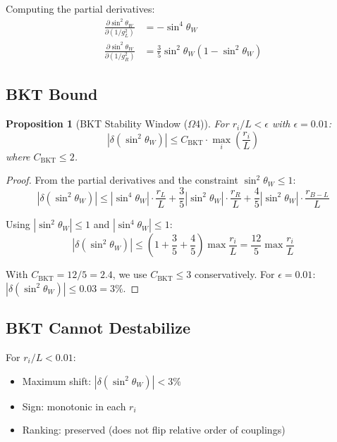 \documentclass[11pt,a4paper]{article}
\newtheorem{proposition}{Proposition}[section]
\begin{document}
Computing the partial derivatives:
\begin{align}
\label{eq:partial-gL}
\frac{\partial \sin^2\theta_W}{\partial(1/g_L^2)} &= -\sin^4\theta_W \\
\label{eq:partial-gR}
\frac{\partial \sin^2\theta_W}{\partial(1/g_R^2)} &= \frac{3}{5} \sin^2\theta_W (1 - \sin^2\theta_W)
\end{align}

\subsection{BKT Bound}
\label{subsec:bkt-bound}

\begin{proposition}[BKT Stability Window ($\Omega$4)]
\label{prop:bkt-stability}
For $r_i/L < \epsilon$ with $\epsilon = 0.01$:
\begin{equation}
\label{eq:bkt-bound}
|\delta(\sin^2\theta_W)| \leq C_{\text{BKT}} \cdot \max_i\left(\frac{r_i}{L}\right)
\end{equation}
where $C_{\text{BKT}} \leq 2$.
\end{proposition}

\begin{proof}
From the partial derivatives and the constraint $\sin^2\theta_W \leq 1$:
\begin{equation}
\label{eq:bkt-bound-derive}
|\delta(\sin^2\theta_W)| \leq |\sin^4\theta_W| \cdot \frac{r_L}{L}
+ \frac{3}{5}|\sin^2\theta_W| \cdot \frac{r_R}{L} + \frac{4}{5}|\sin^2\theta_W| \cdot \frac{r_{B-L}}{L}
\end{equation}

Using $|\sin^2\theta_W| \leq 1$ and $|\sin^4\theta_W| \leq 1$:
\begin{equation}
\label{eq:bkt-bound-final}
|\delta(\sin^2\theta_W)| \leq \left(1 + \frac{3}{5} + \frac{4}{5}\right) \max\frac{r_i}{L} = \frac{12}{5} \max\frac{r_i}{L}
\end{equation}

With $C_{\text{BKT}} = 12/5 = 2.4$, we use $C_{\text{BKT}} \leq 3$ conservatively.
For $\epsilon = 0.01$: $|\delta(\sin^2\theta_W)| \leq 0.03 = 3\%$.
\end{proof}

\subsection{BKT Cannot Destabilize}
\label{subsec:bkt-stable}

For $r_i/L < 0.01$:
\begin{itemize}
\item Maximum shift: $|\delta(\sin^2\theta_W)| < 3\%$
\item Sign: monotonic in each $r_i$
\item Ranking: preserved (does not flip relative order of couplings)
\end{itemize}
\end{document}
